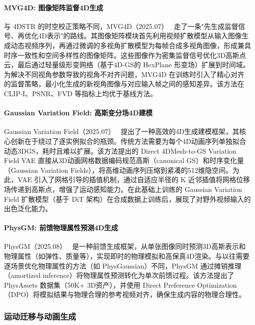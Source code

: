 \paragraph{MVG4D: 图像矩阵监督4D生成}

与 4DSTR 的时空校正策略不同，MVG4D（2025.07）~\cite{2507_18371} 走了一条"先生成监督信号、再优化4D表示"的路线。其图像矩阵模块首先利用视频扩散模型从输入图像生成动态视频序列，再通过微调的多视角扩散模型为每帧合成多视角图像，形成兼具时序一致性和空间多样性的图像矩阵。这些图像作为密集监督信号优化3D高斯点云，最后通过轻量级形变网络（基于4D-GS的 HexPlane 形变场）扩展到时间域。为解决不同视角参数导致的视角不对齐问题，MVG4D 在训练时引入了精心对齐的监督策略，最小化生成的新视角图像与对应输入帧之间的感知差异。该方法在 CLIP-I、PSNR、FVD 等指标上均优于基线方法。

\paragraph{Gaussian Variation Field: 高斯变分场4D建模}

Gaussian Variation Field（2025.07）~\cite{2507_23785} 提出了一种高效的4D生成建模框架，其核心创新在于绕过了逐实例拟合的瓶颈。传统方法需要为每个4D动画序列单独拟合动态3DGS，耗时且难以扩展。该方法提出的 Direct 4DMesh-to-GS Variation Field VAE 直接从3D动画网格数据编码规范高斯（canonical GS）和时序变化量（Gaussian Variation Fields），将高维动画序列压缩到紧凑的512维隐空间。为此，VAE 引入了网格引导的插值机制，通过自适应半径的 K 近邻插值将网格位移场传递到高斯点，增强了运动感知能力。在此基础上训练的 Gaussian Variation Field 扩散模型（基于 DiT 架构）在合成数据上训练后，展现了对野外视频输入的出色泛化能力。

\paragraph{PhysGM: 前馈物理属性预测4D生成}

PhysGM（2025.08）~\cite{2508_13911} 是一种前馈生成框架，从单张图像同时预测3D高斯表示和物理属性（如弹性、质量等），实现即时的物理模拟和高保真4D渲染。与以往需要逐场景优化物理属性的方法（如 PhysGaussian）不同，PhysGM 通过摊销推理（amortized inference）将物理属性预测转化为单次前馈过程。该方法提出了 PhysAssets 数据集（50K+ 3D资产），并使用 Direct Preference Optimization（DPO）将模拟结果与物理合理的参考视频对齐，确保生成内容的物理合理性。

\subsubsection{运动迁移与动画生成}
\label{sec:08_3_1_3}

